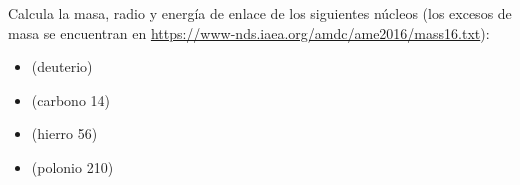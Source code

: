\documentclass[./../main.tex]{subfiles}
\begin{document}
    \begin{exercise}
        Calcula la masa, radio y energía de enlace de los siguientes núcleos (los excesos de masa se encuentran en \url{https://www-nds.iaea.org/amdc/ame2016/mass16.txt}):

		\begin{itemize}
			\item {} (deuterio)
			\item {} (carbono 14)
			\item {} (hierro 56)
			\item {} (polonio 210)
		\end{itemize}
    \end{exercise}
\end{document}
